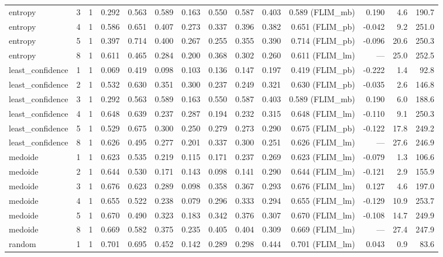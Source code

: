 \begin{adjustbox}{max width=\linewidth}
\begin{tabular}{llrrrrrrrrrrrr}
entropy & 3 & 1 & 0.292 & 0.563 & 0.589 & 0.163 & 0.550 & 0.587 & 0.403 & 0.589 (FLIM\_mb) & 0.190 & 4.6 & 190.7 \\
entropy & 4 & 1 & 0.586 & 0.651 & 0.407 & 0.273 & 0.337 & 0.396 & 0.382 & 0.651 (FLIM\_pb) & -0.042 & 9.2 & 251.0 \\
entropy & 5 & 1 & 0.397 & 0.714 & 0.400 & 0.267 & 0.255 & 0.355 & 0.390 & 0.714 (FLIM\_pb) & -0.096 & 20.6 & 250.3 \\
entropy & 8 & 1 & 0.611 & 0.465 & 0.284 & 0.200 & 0.368 & 0.302 & 0.260 & 0.611 (FLIM\_lm) & --- & 25.0 & 252.5 \\
least\_confidence & 1 & 1 & 0.069 & 0.419 & 0.098 & 0.103 & 0.136 & 0.147 & 0.197 & 0.419 (FLIM\_pb) & -0.222 & 1.4 & 92.8 \\
least\_confidence & 2 & 1 & 0.532 & 0.630 & 0.351 & 0.300 & 0.237 & 0.249 & 0.321 & 0.630 (FLIM\_pb) & -0.035 & 2.6 & 146.8 \\
least\_confidence & 3 & 1 & 0.292 & 0.563 & 0.589 & 0.163 & 0.550 & 0.587 & 0.403 & 0.589 (FLIM\_mb) & 0.190 & 6.0 & 188.6 \\
least\_confidence & 4 & 1 & 0.648 & 0.639 & 0.237 & 0.287 & 0.194 & 0.232 & 0.315 & 0.648 (FLIM\_lm) & -0.110 & 9.1 & 250.3 \\
least\_confidence & 5 & 1 & 0.529 & 0.675 & 0.300 & 0.250 & 0.279 & 0.273 & 0.290 & 0.675 (FLIM\_pb) & -0.122 & 17.8 & 249.2 \\
least\_confidence & 8 & 1 & 0.626 & 0.495 & 0.277 & 0.201 & 0.337 & 0.300 & 0.251 & 0.626 (FLIM\_lm) & --- & 27.6 & 246.9 \\
medoide & 1 & 1 & 0.623 & 0.535 & 0.219 & 0.115 & 0.171 & 0.237 & 0.269 & 0.623 (FLIM\_lm) & -0.079 & 1.3 & 106.6 \\
medoide & 2 & 1 & 0.644 & 0.530 & 0.171 & 0.143 & 0.098 & 0.141 & 0.290 & 0.644 (FLIM\_lm) & -0.121 & 2.9 & 155.9 \\
medoide & 3 & 1 & 0.676 & 0.623 & 0.289 & 0.098 & 0.358 & 0.367 & 0.293 & 0.676 (FLIM\_lm) & 0.127 & 4.6 & 197.0 \\
medoide & 4 & 1 & 0.655 & 0.522 & 0.238 & 0.079 & 0.296 & 0.333 & 0.294 & 0.655 (FLIM\_lm) & -0.129 & 10.9 & 253.7 \\
medoide & 5 & 1 & 0.670 & 0.490 & 0.323 & 0.183 & 0.342 & 0.376 & 0.307 & 0.670 (FLIM\_lm) & -0.108 & 14.7 & 249.9 \\
medoide & 8 & 1 & 0.669 & 0.582 & 0.375 & 0.235 & 0.405 & 0.404 & 0.309 & 0.669 (FLIM\_lm) & --- & 27.4 & 247.9 \\
random & 1 & 1 & 0.701 & 0.695 & 0.452 & 0.142 & 0.289 & 0.298 & 0.444 & 0.701 (FLIM\_lm) & 0.043 & 0.9 & 83.6 \\

\end{tabular}
\end{adjustbox}
